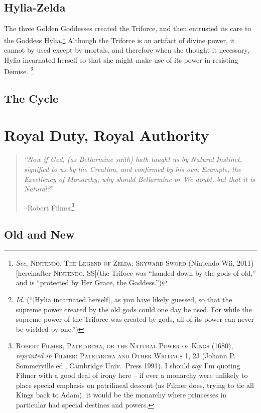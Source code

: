 \documentclass[../FGP.tex]{subfiles}
\begin{document}
\subsection{Hylia-Zelda}
The three Golden Goddesses created the Triforce, and then entrusted its care to the Goddess Hylia.\footnote{\textit{See}, \textsc{Nintendo, The Legend of Zelda: Skyward Sword} (Nintendo Wii, 2011)[hereinafter \textsc{Nintendo, SS}]\label{note:ss}(the Trifoce was ``handed down by the gods of old,'' and is ``protected by Her Grace, the Goddess.'')} Although the Triforce is an artifact of divine power, it cannot by used except by mortals, and therefore when she thought it necessary, Hylia incarnated herself so that she might make use of its power in resisting Demise.%
  \footnote{\textit{Id.} (``[Hylia incarnated herself], as you have likely guessed, so that the supreme power created by the old gods could one day be used. For while the supreme power of the Triforce was created by gods, all of its power can never be wielded by one.'')}
\subsection{The Cycle}

\section{Royal Duty, Royal Authority}\label{sec:world:royalduty} 
  \begin{quote}{\it
  ``Now if God, (as Bellarmine saith) hath taught us by Natural Instinct, signified to us by the Creation, and confirmed by his own Example, the Excellency of Monarchy, why should Bellarmine or We doubt, but that it is Natural?}''

  \hfill--Robert Filmer\footnote{\textsc{Robert Filmer, Patriarcha, or the Natural Power of Kings} (1680), \textit{reprinted in} \textsc{Filmer: Patriarcha and Other Writings} 1, 23 (Johann P. Sommerville ed., Cambridge Univ.~Press 1991). I should say I'm quoting Filmer with a good deal of irony here -- if ever a monarchy were unlikely to place special emphasis on patrilineal descent (as Filmer does, trying to tie all Kings back to Adam), it would be the monarchy where princesses in particular had special destines and powers.}
  \end{quote}

\subsection{Old and New} 
\end{document}
